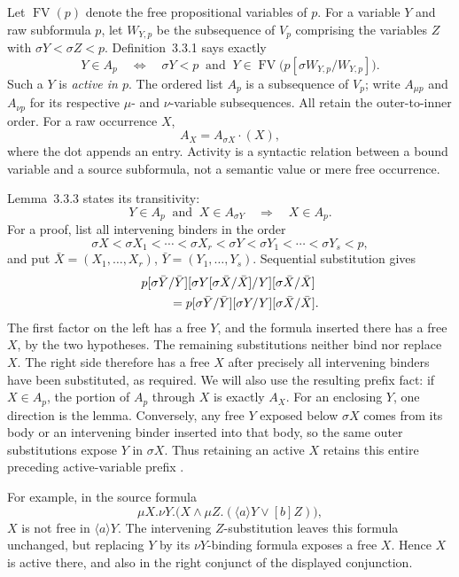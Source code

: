 Let \(\operatorname{FV}(p)\) denote the free propositional variables
of \(p\). For a variable \(Y\) and raw subformula \(p\), let
\(W_{Y,p}\) be the subsequence of \(V_p\) comprising the
variables \(Z\) with \(\sigma Y<\sigma Z<p\).
Definition~3.3.1 says exactly
\[
 Y\in A_p\quad\Longleftrightarrow\quad
 \sigma Y<p\ \text{ and }\
 Y\in\operatorname{FV}\bigl(p[\sigma W_{Y,p}/W_{Y,p}]\bigr).
\]
Such a \(Y\) is \emph{active in \(p\)}. The ordered list
\(A_p\) is a subsequence of \(V_p\); write
\(A_{\mu p}\) and \(A_{\nu p}\) for its respective
\(\mu\)- and \(\nu\)-variable subsequences. All retain the
outer-to-inner order. For a raw occurrence \(X\),
\[
 A_X=A_{\sigma X}\mathbin{\cdot}(X),
\]
where the dot appends an entry. Activity is a syntactic relation
between a bound variable and a source subformula, not a semantic
value or mere free occurrence.

Lemma~3.3.3 states its transitivity:
\[
 Y\in A_p\ \text{ and }\ X\in A_{\sigma Y}
 \quad\Longrightarrow\quad X\in A_p.
\]
For a proof, list all intervening binders in the order
\[
 \sigma X<\sigma X_1<\cdots<\sigma X_r<\sigma Y
   <\sigma Y_1<\cdots<\sigma Y_s<p,
\]
and put \(\bar X=(X_1,\ldots,X_r)\),
\(\bar Y=(Y_1,\ldots,Y_s)\). Sequential substitution gives
\[
\begin{split}
 &p[\sigma\bar Y/\bar Y]
   [\sigma Y[\sigma\bar X/\bar X]/Y]
   [\sigma\bar X/\bar X]\\
 &\hspace{8mm}=
 p[\sigma\bar Y/\bar Y][\sigma Y/Y]
   [\sigma\bar X/\bar X].
\end{split}
\]
The first factor on the left has a free \(Y\), and the
formula inserted there has a free \(X\), by the two hypotheses.
The remaining substitutions neither bind nor replace \(X\).
The right side therefore has a free \(X\) after precisely all
intervening binders have been substituted, as required.
We will also use the resulting prefix fact: if \(X\in A_p\),
the portion of \(A_p\) through \(X\) is exactly \(A_X\).
For an enclosing \(Y\), one direction is the lemma. Conversely,
any free \(Y\) exposed below \(\sigma X\) comes from its
body or an intervening binder inserted into that body, so the
same outer substitutions expose \(Y\) in \(\sigma X\).
Thus retaining an active \(X\) retains this entire preceding
active-variable prefix \cite[pp.~337--338]{Kozen1983}.

For example, in the source formula
\[
 \mu X.\nu Y.
 \bigl(X\land\mu Z.(\langle a\rangle Y\lor[b]Z)\bigr),
 \tag{3.3.2}
\]
\(X\) is not free in \(\langle a\rangle Y\).
The intervening \(Z\)-substitution leaves this formula unchanged,
but replacing \(Y\) by its \(\nu Y\)-binding formula exposes
a free \(X\). Hence \(X\) is active there, and also in the
right conjunct of the displayed conjunction.

